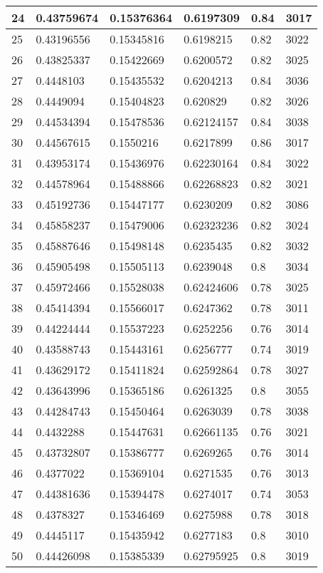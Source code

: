 \begin{longtable}{|l|l|l|l|l|l|}
24 & 0.43759674 & 0.15376364 & 0.6197309 & 0.84 & 3017 \\ \hline 
25 & 0.43196556 & 0.15345816 & 0.6198215 & 0.82 & 3022 \\ \hline 
26 & 0.43825337 & 0.15422669 & 0.6200572 & 0.82 & 3025 \\ \hline 
27 & 0.4448103 & 0.15435532 & 0.6204213 & 0.84 & 3036 \\ \hline 
28 & 0.4449094 & 0.15404823 & 0.620829 & 0.82 & 3026 \\ \hline 
29 & 0.44534394 & 0.15478536 & 0.62124157 & 0.84 & 3038 \\ \hline 
30 & 0.44567615 & 0.1550216 & 0.6217899 & 0.86 & 3017 \\ \hline 
31 & 0.43953174 & 0.15436976 & 0.62230164 & 0.84 & 3022 \\ \hline 
32 & 0.44578964 & 0.15488866 & 0.62268823 & 0.82 & 3021 \\ \hline 
33 & 0.45192736 & 0.15447177 & 0.6230209 & 0.82 & 3086 \\ \hline 
34 & 0.45858237 & 0.15479006 & 0.62323236 & 0.82 & 3024 \\ \hline 
35 & 0.45887646 & 0.15498148 & 0.6235435 & 0.82 & 3032 \\ \hline 
36 & 0.45905498 & 0.15505113 & 0.6239048 & 0.8 & 3034 \\ \hline 
37 & 0.45972466 & 0.15528038 & 0.62424606 & 0.78 & 3025 \\ \hline 
38 & 0.45414394 & 0.15566017 & 0.6247362 & 0.78 & 3011 \\ \hline 
39 & 0.44224444 & 0.15537223 & 0.6252256 & 0.76 & 3014 \\ \hline 
40 & 0.43588743 & 0.15443161 & 0.6256777 & 0.74 & 3019 \\ \hline 
41 & 0.43629172 & 0.15411824 & 0.62592864 & 0.78 & 3027 \\ \hline 
42 & 0.43643996 & 0.15365186 & 0.6261325 & 0.8 & 3055 \\ \hline 
43 & 0.44284743 & 0.15450464 & 0.6263039 & 0.78 & 3038 \\ \hline 
44 & 0.4432288 & 0.15447631 & 0.62661135 & 0.76 & 3021 \\ \hline 
45 & 0.43732807 & 0.15386777 & 0.6269265 & 0.76 & 3014 \\ \hline 
46 & 0.4377022 & 0.15369104 & 0.6271535 & 0.76 & 3013 \\ \hline 
47 & 0.44381636 & 0.15394478 & 0.6274017 & 0.74 & 3053 \\ \hline 
48 & 0.4378327 & 0.15346469 & 0.6275988 & 0.78 & 3018 \\ \hline 
49 & 0.4445117 & 0.15435942 & 0.6277183 & 0.8 & 3010 \\ \hline 
50 & 0.44426098 & 0.15385339 & 0.62795925 & 0.8 & 3019 \\ \hline 
\end{longtable}